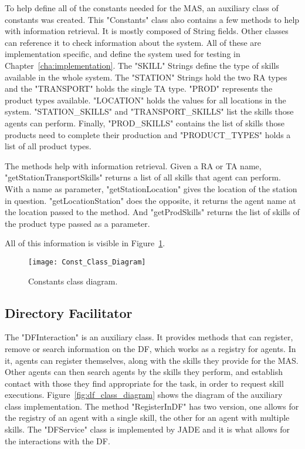 To help define all of the constants needed for the \acrshort{MAS}, an auxiliary class of constants was created. This "Constants" class also contains a few methods to help with information retrieval. It is mostly composed of String fields. Other classes can reference it to check information about the system. All of these are implementation specific, and define the system used for testing in Chapter~\ref{cha:implementation}. The "SKILL" Strings define the type of skills available in the whole system. The "STATION" Strings hold the two \acrshort{RA} types and the "TRANSPORT" holds the single \acrshort{TA} type. "PROD" represents the product types available. "LOCATION" holds the values for all locations in the system. "STATION\_SKILLS" and "TRANSPORT\_SKILLS" list the skills those agents can perform. Finally, "PROD\_SKILLS" contains the list of skills those products need to complete their production and "PRODUCT\_TYPES" holds a list of all product types.

The methods help with information retrieval. Given a \acrshort{RA} or \acrshort{TA} name, "getStationTransportSkills" returns a list of all skills that agent can perform. With a name as parameter, "getStationLocation" gives the location of the station in question. "getLocationStation" does the opposite, it returns the agent name at the location passed to the method. And "getProdSkills" returns the list of skills of the product type passed as a parameter.

All of this information is visible in Figure~\ref{fig:const_class_diagram}. 

\begin{figure}[h!]
	\centering
	\texttt{[image: Const\_Class\_Diagram]}
	\caption{Constants class diagram.}
	\label{fig:const_class_diagram}
\end{figure}

\subsection{Directory Facilitator}
\label{subsec:directory_facilitator}

The "DFInteraction" is an auxiliary class. It provides methods that can register, remove or search information on the \acrshort{DF}, which works as a registry for agents. In it, agents can register themselves, along with the skills they provide for the \acrshort{MAS}. Other agents can then search agents by the skills they perform, and establish contact with those they find appropriate for the task, in order to request skill executions. Figure~\ref{fig:df_class_diagram} shows the diagram of the auxiliary class implementation. The method "RegisterInDF" has two version, one allows for the registry of an agent with a single skill, the other for an agent with multiple skills. The "DFService" class is implemented by \acrshort{JADE} and it is what allows for the interactions with the \acrshort{DF}.\\

